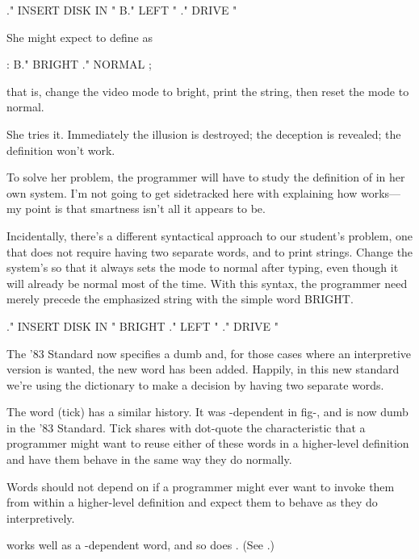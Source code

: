 \begin{Code}
." INSERT DISK IN "  B." LEFT "  ." DRIVE "
\end{Code}
She might expect to define  as

\begin{Code}
: B."   BRIGHT  ."  NORMAL ;
\end{Code}
that is, change the video mode to bright, print the string, then reset the
mode to normal.

She tries it. Immediately the illusion is destroyed; the deception is
revealed; the definition won't work.

To solve her problem, the programmer will have to study the definition
of  in her own system. I'm not going to get sidetracked here with
explaining how  works---my point is that smartness isn't all it
appears to be.

Incidentally, there's a different syntactical approach to our
student's problem, one that does not require having two separate words,
 and  to print strings. Change the system's  so
that it always sets the mode to normal after typing, even though it will
already be normal most of the time. With this syntax, the programmer
need merely precede the emphasized string with the simple word BRIGHT.

\begin{Code}
." INSERT DISK IN "  BRIGHT ." LEFT "  ." DRIVE "
\end{Code}
The '83 Standard now specifies a dumb  and, for those cases where an
interpretive version is wanted, the new word  has been added. Happily,
in this new standard we're using the dictionary to make a decision by
having two separate words.

The word  (tick) has a similar history. It was -dependent in
fig-\Forth{}, and is now dumb in the '83 Standard. Tick shares with
dot-quote the characteristic that a programmer might want to reuse either of
these words in a higher-level definition and have them behave in the same
way they do normally.%

\begin{tip}
Words should not depend on  if a programmer might ever want to
invoke them from within a higher-level definition and expect them to
behave as they do interpretively.
\end{tip}
 works well as a -dependent word, and so does .
(See .)%
%

